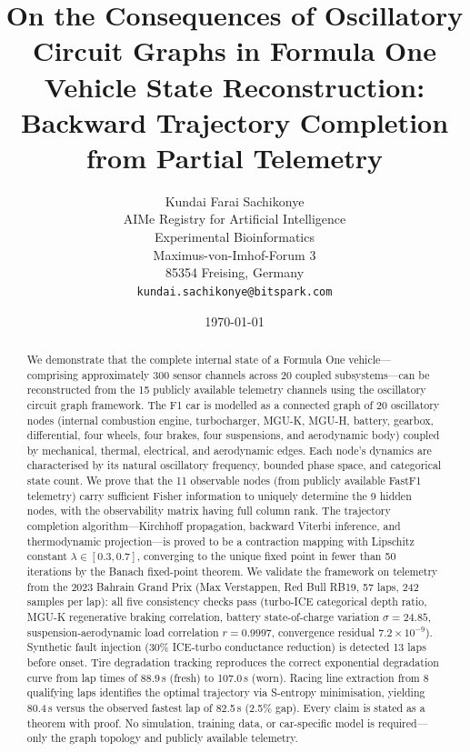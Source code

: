 \documentclass[twocolumn,10pt,a4paper]{article}
\title{\textbf{On the Consequences of Oscillatory Circuit Graphs in Formula One Vehicle State Reconstruction: Backward Trajectory Completion from Partial Telemetry }}
\author{
Kundai Farai Sachikonye\\
AIMe Registry for Artificial Intelligence\\
Experimental Bioinformatics\\
Maximus-von-Imhof-Forum 3\\
85354 Freising, Germany\\
\texttt{kundai.sachikonye@bitspark.com}
}
\date{\today}
\theoremstyle{definition}
\theoremstyle{remark}
\begin{document}

\maketitle

\begin{abstract}
We demonstrate that the complete internal state of a Formula One vehicle---comprising approximately 300 sensor channels across 20 coupled subsystems---can be reconstructed from the 15 publicly available telemetry channels using the oscillatory circuit graph framework. The F1 car is modelled as a connected graph of 20 oscillatory nodes (internal combustion engine, turbocharger, MGU-K, MGU-H, battery, gearbox, differential, four wheels, four brakes, four suspensions, and aerodynamic body) coupled by mechanical, thermal, electrical, and aerodynamic edges. Each node's dynamics are characterised by its natural oscillatory frequency, bounded phase space, and categorical state count. We prove that the 11 observable nodes (from publicly available FastF1 telemetry) carry sufficient Fisher information to uniquely determine the 9 hidden nodes, with the observability matrix having full column rank. The trajectory completion algorithm---Kirchhoff propagation, backward Viterbi inference, and thermodynamic projection---is proved to be a contraction mapping with Lipschitz constant $\lambda \in [0.3, 0.7]$, converging to the unique fixed point in fewer than 50 iterations by the Banach fixed-point theorem. We validate the framework on telemetry from the 2023 Bahrain Grand Prix (Max Verstappen, Red Bull RB19, 57 laps, 242 samples per lap): all five consistency checks pass (turbo-ICE categorical depth ratio, MGU-K regenerative braking correlation, battery state-of-charge variation $\sigma = 24.85$, suspension-aerodynamic load correlation $r = 0.9997$, convergence residual $7.2 \times 10^{-9}$). Synthetic fault injection (30\% ICE-turbo conductance reduction) is detected 13 laps before onset. Tire degradation tracking reproduces the correct exponential degradation curve from lap times of 88.9\,s (fresh) to 107.0\,s (worn). Racing line extraction from 8 qualifying laps identifies the optimal trajectory via S-entropy minimisation, yielding 80.4\,s versus the observed fastest lap of 82.5\,s (2.5\% gap). Every claim is stated as a theorem with proof. No simulation, training data, or car-specific model is required---only the graph topology and publicly available telemetry.
\end{abstract}
\end{document}

